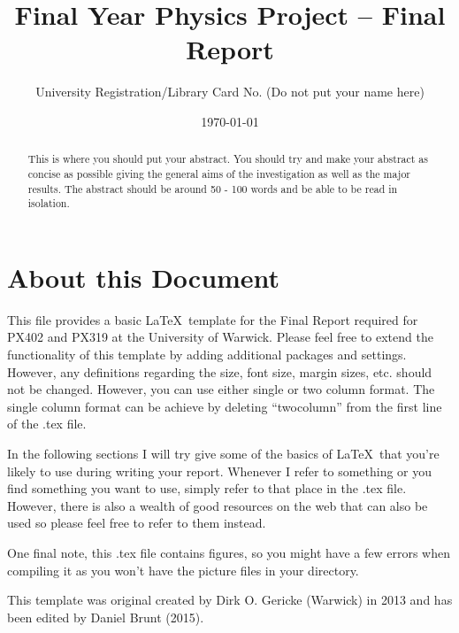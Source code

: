\documentclass[a4paper, onecolumn, 12pt, notitlepage]{revtex4-1}
\begin{document}
\title{Final Year Physics Project – Final Report}

\author{University Registration/Library Card No. (Do not put your name here)}
\date{\today}



\begin{abstract} 
This is where you should put your abstract. You should try and make your abstract as concise as possible giving the general aims of the investigation as well as the major results. The abstract should be around 50 - 100 words and be able to be read in isolation.  
\end{abstract}


\maketitle

\vspace{-10mm}

\section{About this Document}
This file provides a basic \LaTeX\ template for the Final Report required for PX402 and PX319 at the University of Warwick. Please feel free to extend the functionality of this template by adding additional packages and settings. However, any definitions regarding the size, font size, margin sizes, etc. should not be changed. However, you can use either single or two column format. The single column format can be achieve by deleting ``twocolumn'' from the first line of the .tex file.

In the following sections I will try give some of the basics of \LaTeX\ that you're likely to use during writing your report. Whenever I refer to something or you find something you want to use, simply refer to that place in the .tex file. However, there is also a wealth of good resources on the web that can also be used so please feel free to refer to them instead.

One final note, this .tex file contains figures, so you might have a few errors when compiling it as you won't have the  picture files in your directory.  

This template was original created by Dirk O. Gericke (Warwick) in 2013 and has been edited by Daniel Brunt (2015). 
\end{document}
